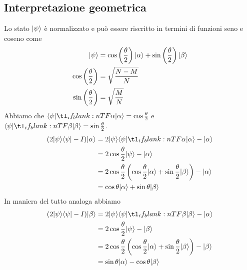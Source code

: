 \documentclass[12pt, a4paper]{report}
\begin{document}
\subsection{Interpretazione geometrica}
Lo stato $| \psi \rangle$ è normalizzato e può essere riscritto in termini di funzioni seno e coseno come
\begin{equation*}
    \begin{split}
        | \psi \rangle &= \cos\left(\frac{\theta}{2}\right)| \alpha \rangle+\sin\left(\frac{\theta}{2}\right)| \beta \rangle \\
        \cos\left(\frac{\theta}{2}\right) &= \sqrt{\frac{N-M}{N}} \\
        \sin\left(\frac{\theta}{2}\right) &= \sqrt{\frac{M}{N}}
    \end{split}
\end{equation*}
Abbiamo che $\braket{\psi}{\alpha}=\cos\frac{\theta}{2}$ e $\braket{\psi}{\beta}=\sin\frac{\theta}{2}$.
\begin{equation*}
    \begin{split}
        (2\ket{\psi}\bra{\psi}-I)\ket{\alpha} &= 2\ket{\psi}\braket{\psi}{\alpha}-\ket{\alpha} \\
        &= 2\cos\frac{\theta}{2}\ket{\psi}-\ket{\alpha} \\
        &= 2\cos\frac{\theta}{2}\left(\cos\frac{\theta}{2}\ket{\alpha}+\sin\frac{\theta}{2}\ket{\beta}\right)-\ket{\alpha} \\
        &= \cos\theta\ket{\alpha}+\sin\theta\ket{\beta}
    \end{split}
\end{equation*}
In maniera del tutto analoga abbiamo
\begin{equation*}
    \begin{split}
        (2\ket{\psi}\bra{\psi}-I)\ket{\beta} &= 2\ket{\psi}\braket{\psi}{\beta}-\ket{\alpha} \\
        &= 2\cos\frac{\theta}{2}\ket{\psi}-\ket{\beta} \\
        &= 2\cos\frac{\theta}{2}\left(\cos\frac{\theta}{2}\ket{\alpha}+\sin\frac{\theta}{2}\ket{\beta}\right)-\ket{\beta} \\
        &= \sin\theta\ket{\alpha}-\cos\theta\ket{\beta}
    \end{split}
\end{equation*}
\end{document}
